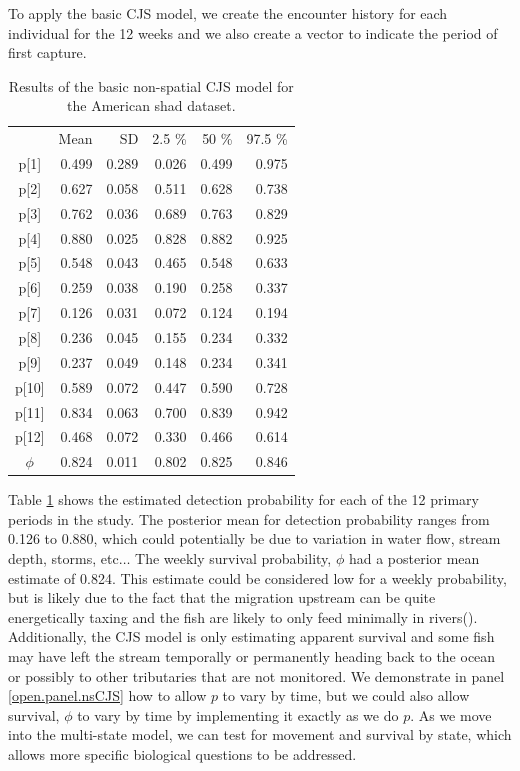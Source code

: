 To apply the basic CJS model, we create the
encounter history for each individual for the 12 weeks and we also create
a vector to indicate the period of first capture.

\begin{table}
\centering
\caption{Results of the basic non-spatial CJS model for the American shad dataset.
}
\begin{tabular}{crrrrr}
\hline \hline
&    Mean   &  SD  &  2.5 \%   &   50 \%    &  97.5 \% \\
p[1] & 0.499 & 0.289 & 0.026 & 0.499 & 0.975 \\
p[2] & 0.627 & 0.058 & 0.511 & 0.628 & 0.738 \\
p[3] & 0.762 & 0.036 & 0.689 & 0.763 & 0.829 \\
p[4] & 0.880 & 0.025 & 0.828 & 0.882 & 0.925 \\
p[5] & 0.548 & 0.043 & 0.465 & 0.548 & 0.633 \\
p[6] & 0.259 & 0.038 & 0.190 & 0.258 & 0.337 \\
p[7] & 0.126 & 0.031 & 0.072 & 0.124 & 0.194 \\
p[8] & 0.236 & 0.045 & 0.155 & 0.234 & 0.332 \\
p[9] & 0.237 & 0.049 & 0.148 & 0.234 & 0.341 \\
p[10]& 0.589 & 0.072 & 0.447 & 0.590 & 0.728  \\
p[11]& 0.834 & 0.063 & 0.700 & 0.839 & 0.942 \\
p[12]& 0.468 & 0.072 & 0.330 & 0.466 & 0.614 \\
$\phi$  & 0.824 & 0.011 & 0.802 & 0.825 & 0.846 \\
\hline
\end{tabular}
\label{open.tab.simple-shad}
\end{table}

Table \ref{open.tab.simple-shad} shows the estimated detection probability for each of the 12 primary periods
in the study.  The posterior mean for detection probability ranges from 0.126 to 0.880, which could potentially
be due to variation in water flow, stream depth, storms, etc$\dots$  The weekly survival probability, $\phi$ had a
posterior mean estimate of 0.824.  This estimate could be considered low for a weekly probability, but
is likely due to the fact
that the migration upstream can be quite energetically taxing and the fish are likely to only feed minimally
in rivers(\citep{leggett_carscadden:1978, leonard_mccormick:1999}).
Additionally, the CJS model is only estimating apparent survival
and some fish may have left the stream temporally or permanently heading back to the ocean
or possibly to other tributaries that are not monitored.
We demonstrate in panel \ref{open.panel.nsCJS}
how to allow $p$ to vary by time, but we could also allow survival, $\phi$ to vary by time by
implementing it exactly as
we do $p$.
As we move into the multi-state model, 
we can test for movement and survival by state, which allows more specific biological questions to be addressed.




